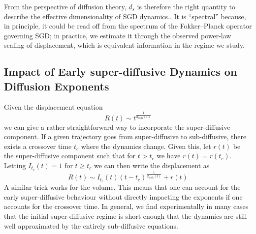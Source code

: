 \documentclass{article} %
\theoremstyle{definition}
\begin{document}
From the perspective of diffusion theory, $d_s$ is therefore the right quantity to describe the effective dimensionality of SGD dynamics.. It is “spectral” because, in principle, it could be read off from the spectrum of the Fokker–Planck operator governing SGD; in practice, we estimate it through the observed power-law scaling of displacement, which is equivalent information in the regime we study.


\subsection{Impact of Early super-diffusive Dynamics on Diffusion Exponents}\label{app:early_superdiffusion}
Given the displacement equation
\begin{equation}
    R(t) \sim t^{\frac{1}{d_\text{walk}(t)}}
\end{equation}
we can give a rather straightforward way to incorporate the super-diffusive component. If a given trajectory goes from super-diffusive to sub-diffusive, there exists a crossover time $t_c$ where the dynamics change. Given this, let $r(t)$ be the super-diffusive component such that for $t>t_c$ we have $r(t) = r(t_c)$. Letting $I_{t_c}(t) = 1$ for $t \geq t_c$ we can then write the displacement as
\begin{equation}
    R(t) \sim I_{t_c}(t)(t-t_c)^{\frac{1}{d_\text{walk}(t)}} + r(t)
\end{equation}
A similar trick works for the volume. This means that one can account for the early super-diffusive behaviour without directly impacting the exponents if one accounts for the crossover time. In general, we find experimentally in many cases that the initial super-diffusive regime is short enough that the dynamics are still well approximated by the entirely sub-diffusive equations.

\end{document}
